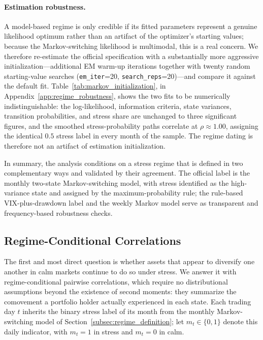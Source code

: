 \paragraph{Estimation robustness.}
A model-based regime is only credible if its fitted parameters represent a genuine likelihood optimum rather than an artifact of the optimizer's starting values; because the Markov-switching likelihood is multimodal, this is a real concern. We therefore re-estimate the official specification with a substantially more aggressive initialization---additional EM warm-up iterations together with twenty random starting-value searches (\texttt{em\_iter}{=}20, \texttt{search\_reps}{=}20)---and compare it against the default fit. Table~\ref{tab:markov_initialization}, in Appendix~\ref{app:regime_robustness}, shows the two fits to be numerically indistinguishable: the log-likelihood, information criteria, state variances, transition probabilities, and stress share are unchanged to three significant figures, and the smoothed stress-probability paths correlate at $\rho \approx 1.00$, assigning the identical $0.5$ stress label in every month of the sample. The regime dating is therefore not an artifact of estimation initialization.

In summary, the analysis conditions on a stress regime that is defined in two complementary ways and validated by their agreement. The official label is the monthly two-state Markov-switching model, with stress identified as the high-variance state and assigned by the maximum-probability rule; the rule-based VIX-plus-drawdown label and the weekly Markov model serve as transparent and frequency-based robustness checks.

\subsection{Regime-Conditional Correlations}
\label{subsec:regime_correlations}

The first and most direct question is whether assets that appear to diversify one another in calm markets continue to do so under stress. We answer it with regime-conditional pairwise correlations, which require no distributional assumptions beyond the existence of second moments: they summarize the comovement a portfolio holder actually experienced in each state. Each trading day $t$ inherits the binary stress label of its month from the monthly Markov-switching model of Section~\ref{subsec:regime_definition}; let $m_t \in \{0,1\}$ denote this daily indicator, with $m_t = 1$ in stress and $m_t = 0$ in calm.

